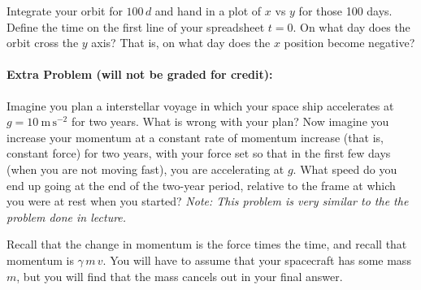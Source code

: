 \documentclass[12pt]{article}
\newcommand{\m}{\mathrm{m}}
\newcommand{\s}{\mathrm{s}}
\newcounter{problem}
\begin{document}
Integrate your orbit for $100\,d$ and hand in a plot of $x$ vs $y$ for
those 100 days.  Define the time on the first line of your spreadsheet
$t=0$.  On what day does the orbit cross the $y$ axis?  That is, on
what day does the $x$ position become negative?

\paragraph{Extra Problem (will not be graded for credit):}
Imagine you plan a interstellar voyage in which your space ship
accelerates at $g=10~\m\,\s^{-2}$ for two years.  What is wrong with
your plan?  Now imagine you increase your momentum at a constant rate
of momentum increase (that is, constant force) for two years, with
your force set so that in the first few days (when you are not moving
fast), you are accelerating at $g$.  What speed do you end up going at
the end of the two-year period, relative to the frame at which you
were at rest when you started?  \textit{Note: This problem is very
  similar to the the problem done in lecture.}

Recall that the change in momentum is the force times the time, and
recall that momentum is $\gamma\,m\,v$.  You will have to assume that
your spacecraft has some mass $m$, but you will find that the mass
cancels out in your final answer.
\end{document}
